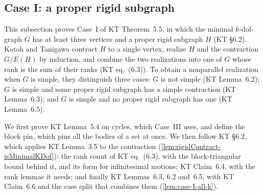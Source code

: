 \subsection{Case I: a proper rigid subgraph}
\label{sec:molecular-algebraic-induction-caseI}

This subsection proves Case~I of KT Theorem~5.5, in which the minimal
$k$-dof-graph $G$ has at least three vertices and a proper rigid
subgraph $H$ (KT \S6.2). Katoh and Tanigawa contract $H$ to a single
vertex, realize $H$ and the contraction $G/E(H)$ by induction, and
combine the two realizations into one of $G$ whose rank is the sum of
their ranks (KT eq.~(6.3)). To obtain a nonparallel realization when $G$
is simple, they distinguish three cases: $G$ is not simple (KT
Lemma~6.2); $G$ is simple and some proper rigid subgraph has a simple
contraction (KT Lemma~6.3); and $G$ is simple and no proper rigid
subgraph has one (KT Lemma~6.5).

We first prove KT Lemma~5.4 on cycles, which Case~III uses, and define
the block pin, which pins all the bodies of a set at once. We then
follow KT \S6.2, which applies KT Lemma~3.5 to the contraction
(\cref{lem:rigidContract-isMinimalKDof}): the rank count of KT
eq.~(6.3), with the block-triangular bound behind it, and its form for
infinitesimal motions; KT Claim~6.4, with the rank lemmas it needs; and
finally KT Lemmas~6.3, 6.2 and~6.5, with KT Claim~6.6 and the case
split that combines them (\cref{lem:case-I-all-k}).

